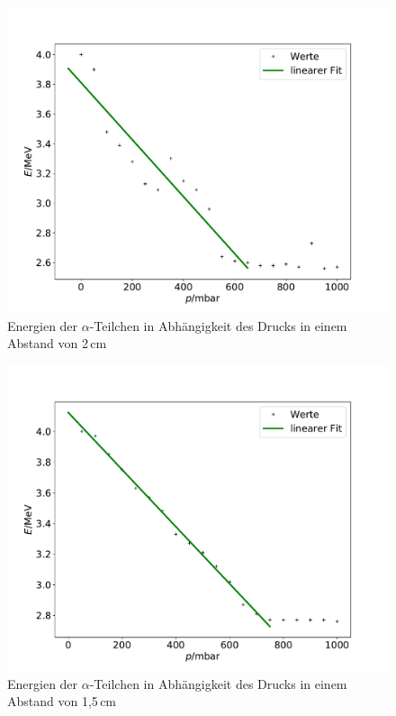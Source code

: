 \begin{figure}[H]
\centering
\includegraphics[width=\textwidth]{ep2.pdf}
\caption{Energien der $\alpha$-Teilchen in Abhängigkeit des Drucks in einem Abstand von 2\,cm}
\label{fig:ep2}
\end{figure}

\begin{figure}[H]
\centering
\includegraphics[width=\textwidth]{ep15.pdf}
\caption{Energien der $\alpha$-Teilchen in Abhängigkeit des Drucks in einem Abstand von 1,5\,cm}
\label{fig:ep15}
\end{figure}

